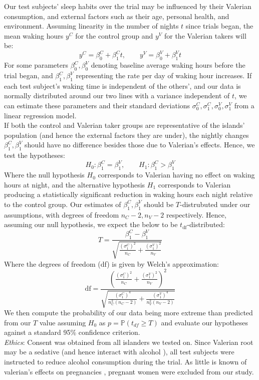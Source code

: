 \documentclass[10pt,preprintnumbers,amsmath,amssymb,floatfix,twocolumn,prl]{revtex4-2}
\begin{document}
Our test subjects' sleep habits over the trial may be influenced by their Valerian consumption, and external factors such as their age, personal health, and environment. Assuming linearity in the number of nights $t$ since trials began, the mean waking hours $y^C$ for the control group and $y^V$ for the Valerian takers will be:
$$y^C = \beta_0^C + \beta_1^C t, \qquad y^V = \beta_0^V + \beta_1^V t$$
For some parameters $\beta_0^C, \beta_0^V$ denoting baseline average waking hours before the trial began, and $\beta_1^C, \beta_1^V$ representing the rate per day of waking hour increases. If each test subject's waking time is independent of the others', and our data is normally distributed around our two lines with a variance independent of $t$, we can estimate these parameters and their standard deviations $\sigma_0^C, \sigma_1^C, \sigma_0^V, \sigma_1^V$ from a linear regression model. \\

If both the control and Valerian taker groups are representative of the islands' population (and hence the external factors they are under), the nightly changes $\beta_1^C, \beta_1^V$ should have no difference besides those due to Valerian's effects. Hence, we test the hypotheses:
$$H_0: \beta_1^C = \beta_1^V, \qquad H_1: \beta_1^C > \beta_1^V$$
Where the null hypothesis $H_0$ corresponds to Valerian having no effect on waking hours at night, and the alternative hypothesis $H_1$ corresponds to Valerian producing a statistically significant reduction in waking hours each night relative to the control group. Our estimates of $\beta_1^C, \beta_1^V$ should be $T$-distrubuted under our assumptions, with degrees of freedom $n_C - 2, n_V - 2$ respectively. Hence, assuming our null hypothesis, we expect the below to be $t_\text{df}$-distributed:
$$T = \frac{\beta_1^C - \beta_1^V}{\sqrt{\frac{(\sigma_1^C)^2}{n_C} + \frac{(\sigma_1^V)^2}{n_V}}}$$
Where the degrees of freedom (df) is given by Welch's approximation:
$$\text{df} = \frac{\left(\frac{(\sigma_1^C)^2}{n_C} + \frac{(\sigma_1^V)^2}{n_V}\right)^2}{\sqrt{\frac{(\sigma_1^C)^4}{n_C^2 (n_C - 2)} + \frac{(\sigma_1^V)^4}{n_V^2 (n_V - 2)}}}$$
We then compute the probability of our data being more extreme than predicted from our $T$ value assuming $H_0$ as $p = \mathbb{P}(t_{df} \geq T)$ and evaluate our hypotheses against a standard 95\% confidence criterion. \\

\textit{Ethics}: Consent was obtained from all islanders we tested on. Since Valerian root may be a sedative (and hence interact with alcohol \cite{ValerianSource1}), all test subjects were instructed to reduce alcohol consumption during the trial. As little is known of valerian's effects on pregnancies \cite{ValerianSource2}, pregnant women were excluded from our study. \\
\end{document}
